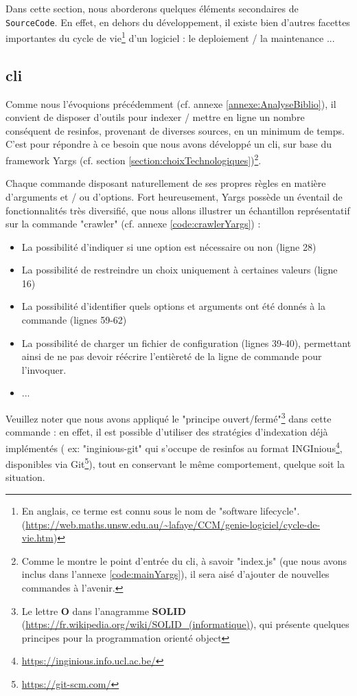 Dans cette section, nous aborderons quelques éléments secondaires de \texttt{SourceCode}.
En effet, en dehors du développement, il existe bien d'autres facettes importantes du cycle de vie\footnote{
    En anglais, ce terme est connu sous le nom de "software lifecycle". (\url{https://web.maths.unsw.edu.au/~lafaye/CCM/genie-logiciel/cycle-de-vie.htm})
} d'un logiciel : le \gls{deploiement} / la \gls{maintenance}  ...

\subsection{\texorpdfstring{\Gls{cli}}{CLI}}

Comme nous l'évoquions précédemment (cf. annexe \ref{annexe:AnalyseBiblio}), il convient de disposer d'outils pour indexer / mettre en ligne un nombre conséquent de 
\glspl{resinfo}, provenant de diverses sources, en un minimum de temps. C'est pour répondre à ce besoin que nous avons développé un \Gls{cli}, sur base du framework Yargs
(cf. section \ref{section:choixTechnologiques})\footnote{
    Comme le montre le point d'entrée du \Gls{cli}, à savoir "index.js" (que nous avons inclus dans l'annexe \ref{code:mainYargs}), il sera aisé d'ajouter de nouvelles commandes à l'avenir.
}.


Chaque commande disposant naturellement de ses propres règles en matière d'arguments et / ou d'options.
Fort heureusement, Yargs possède un éventail de fonctionnalités très diversifié, que nous allons illustrer un échantillon représentatif sur la commande "crawler" (cf. annexe \ref{code:crawlerYargs}) :
\begin{itemize}[nosep,noitemsep,topsep=0pt,partopsep=0pt,after=\vspace*{2pt}]
    \item La possibilité d'indiquer si une option est nécessaire ou non (ligne 28)
    \item La possibilité de restreindre un choix uniquement à certaines valeurs (ligne 16)
    \item La possibilité d'identifier quels options et arguments ont été donnés à la commande (lignes 59-62)
    \item La possibilité de charger un fichier de configuration (lignes 39-40), permettant ainsi de ne pas devoir réécrire l'entièreté de la ligne de commande pour l'invoquer. 
    \item ...
\end{itemize}
Veuillez noter que nous avons appliqué le "principe ouvert/fermé"\footnote{
    Le lettre \textbf{O} dans l'anagramme \textbf{SOLID} (\url{https://fr.wikipedia.org/wiki/SOLID\_(informatique)}), qui présente quelques principes pour la programmation orienté object
} dans cette commande : en effet, il est possible d'utiliser des stratégies d'indexation déjà implémentés (
ex: "inginious-git" qui s'occupe de \glspl{resinfo} au format INGInious\footnote{
    \url{https://inginious.info.ucl.ac.be/}
}, disponibles via Git\footnote{
    \url{https://git-scm.com/}
}), tout en conservant le même comportement, quelque soit la situation. 

